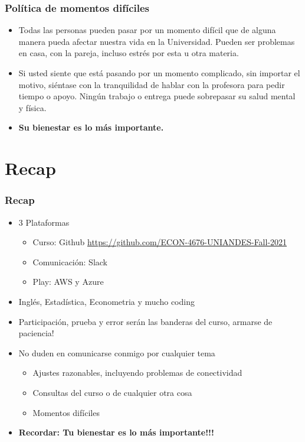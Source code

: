 \documentclass[
  shownotes,
  xcolor={svgnames},
  hyperref={colorlinks,citecolor=DarkBlue,linkcolor=DarkRed,urlcolor=DarkBlue}
  , aspectratio=169]{beamer}
\begin{document}
\begin{frame}
\frametitle{Política de momentos difíciles}

\begin{itemize}
\item Todas las personas pueden pasar por un momento difícil que de alguna manera pueda afectar nuestra vida en la Universidad. Pueden ser problemas en casa, con la pareja, incluso estrés por esta u otra materia.
\medskip
\item Si usted siente que está pasando por un momento complicado, sin importar el motivo, siéntase con la tranquilidad de hablar con la profesora para pedir tiempo o apoyo. Ningún trabajo o entrega puede sobrepasar su salud mental y física.
\medskip
 \item {\bf Su bienestar es lo más importante.}
\end{itemize}
\end{frame}


\section{Recap}
\begin{frame}
\frametitle{Recap}

\begin{itemize} 
  \item 3 Plataformas
    \begin{itemize} 
      \item Curso: Github \url{https://github.com/ECON-4676-UNIANDES-Fall-2021}
      \item Comunicación: Slack
      \item Play: AWS y Azure
    \end{itemize}
    \medskip
    \item Inglés, Estadística, Econometria y mucho coding
    \medskip
    \item Participación, prueba y error serán las banderas del curso, armarse de paciencia!
    \medskip
    \item No duden en comunicarse conmigo por cualquier tema
    \begin{itemize} 
      \item Ajustes razonables, incluyendo problemas de conectividad
      \item Consultas del curso o de cualquier otra cosa
      \item Momentos difíciles 
    \end{itemize}
    \bigskip
    \item {\bf Recordar: Tu bienestar es lo más importante!!!}
\end{itemize}
\end{frame}
\end{document}
